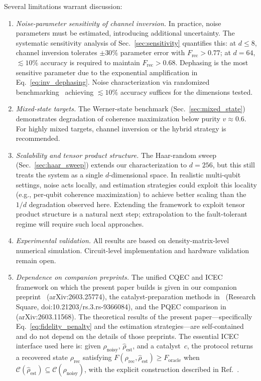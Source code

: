 \documentclass[prx,twocolumn,superscriptaddress,longbibliography,floatfix]{revtex4-2}
\newcommand{\CC}{\mathcal{C}}
\newcommand{\Frec}{F_\mathrm{rec}}
\newcommand{\rhon}{\rho_\mathrm{noisy}}
\newcommand{\rhor}{\rho_\mathrm{rec}}
\newcommand{\rhoe}{\hat{\rho}_\mathrm{est}}
\begin{document}
Several limitations warrant discussion:
\begin{enumerate}
\item \emph{Noise-parameter sensitivity of channel inversion.}
In practice, noise parameters must be estimated, introducing additional uncertainty.
The systematic sensitivity analysis of Sec.~\ref{sec:sensitivity} quantifies this: at $d \leq 8$, channel inversion tolerates $\pm 30\%$ parameter error with $\Frec > 0.77$; at $d = 64$, $\lesssim 10\%$ accuracy is required to maintain $\Frec > 0.68$.
Dephasing is the most sensitive parameter due to the exponential amplification in Eq.~\eqref{eq:inv_dephasing}.
Noise characterization via randomized benchmarking~\cite{Emerson2005} achieving $\lesssim 10\%$ accuracy suffices for the dimensions tested.
\item \emph{Mixed-state targets.}
The Werner-state benchmark (Sec.~\ref{sec:mixed_state}) demonstrates degradation of coherence maximization below purity $v \approx 0.6$.
For highly mixed targets, channel inversion or the hybrid strategy is recommended.
\item \emph{Scalability and tensor product structure.}
The Haar-random sweep (Sec.~\ref{sec:haar_sweep}) extends our characterization to $d = 256$, but this still treats the system as a single $d$-dimensional space.
In realistic multi-qubit settings, noise acts locally, and estimation strategies could exploit this locality (e.g., per-qubit coherence maximization) to achieve better scaling than the $1/d$ degradation observed here.
Extending the framework to exploit tensor product structure is a natural next step; extrapolation to the fault-tolerant regime will require such local approaches.
\item \emph{Experimental validation.}
All results are based on density-matrix-level numerical simulation.
Circuit-level implementation and hardware validation remain open.
\item \emph{Dependence on companion preprints.}
The unified CQEC and ICEC framework on which the present paper builds is given in our companion preprint~\cite{Wakaura2026unified} (arXiv:2603.25774), the catalyst-preparation methods in~\cite{Wakaura2026catalyst} (Research Square, doi:10.21203/rs.3.rs-9366084), and the PQEC comparison in~\cite{Raghoonanan2026} (arXiv:2603.11568).
The theoretical results of the present paper---specifically Eq.~\eqref{eq:fidelity_penalty} and the estimation strategies---are self-contained and do not depend on the details of those preprints.
The essential ICEC interface used here is: given $\rhon$, $\rhoe$, and a catalyst~$c$, the protocol returns a recovered state $\rhor$ satisfying $F(\rhor, \rhoe) \geq F_\mathrm{oracle}$ when $\CC(\rhoe) \subseteq \CC(\rhon)$, with the explicit construction described in Ref.~\cite{Wakaura2026unified}.
\end{enumerate}
\end{document}
